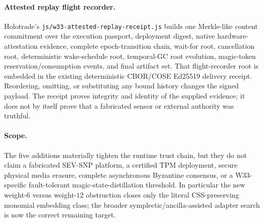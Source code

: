 \paragraph{Attested replay flight recorder.}
Holotrade's \texttt{js/w33-attested-replay-receipt.js} builds one Merkle-like
content commitment over the execution passport, deployment digest, native
hardware-attestation evidence, complete epoch-transition chain, wait-for root,
cancellation root, deterministic wake-schedule root, temporal-GC root
evolution, magic-token reservation/consumption events, and final artifact set.
That flight-recorder root is embedded in the existing deterministic CBOR/COSE
Ed25519 delivery receipt.  Reordering, omitting, or substituting any bound
history changes the signed payload.  The receipt proves integrity and identity
of the supplied evidence; it does not by itself prove that a fabricated sensor
or external authority was truthful.

\paragraph{Scope.}
The five additions materially tighten the runtime trust chain, but they do not
claim a fabricated SEV-SNP platform, a certified TPM deployment, secure physical
media erasure, complete asynchronous Byzantine consensus, or a W33-specific
fault-tolerant magic-state-distillation threshold.  In particular the new
weight-$6$ versus weight-$12$ obstruction closes only the literal CSS-preserving
monomial embedding class; the broader symplectic/ancilla-assisted adapter search
is now the correct remaining target.

